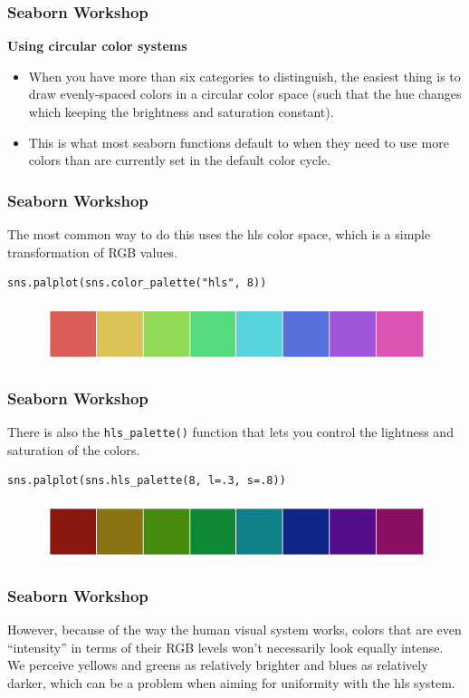 \documentclass{beamer}
\begin{document}
\begin{frame}[fragile]
\frametitle{Seaborn Workshop}
\large
\noindent \textbf{Using circular color systems}
\begin{itemize}
\item When you have more than six categories to distinguish, the easiest thing is to draw evenly-spaced colors in a circular color space (such that the hue changes which keeping the brightness and saturation constant). 
\item This is what most seaborn functions default to when they need to use more colors than are currently set in the default color cycle.
\end{itemize}

\end{frame}
\begin{frame}[fragile]
	\frametitle{Seaborn Workshop}
	\large
The most common way to do this uses the hls color space, which is a simple transformation of RGB values.

\begin{verbatim}
sns.palplot(sns.color_palette("hls", 8))
\end{verbatim}
\begin{figure}
\centering
\includegraphics[width=0.7\linewidth]{images/color_palettes_10_0}
\caption{}
\label{fig:color_palettes_10_0}
\end{figure}


\end{frame}
\begin{frame}[fragile]
	\frametitle{Seaborn Workshop}
	\large
There is also the \texttt{hls\_palette()} function that lets you control the lightness and saturation of the colors.
\begin{verbatim}
sns.palplot(sns.hls_palette(8, l=.3, s=.8))
\end{verbatim}
\begin{figure}
\centering
\includegraphics[width=0.7\linewidth]{images/color_palettes_12_0}
\caption{}
\label{fig:color_palettes_12_0}
\end{figure}

\end{frame}
\begin{frame}[fragile]
\frametitle{Seaborn Workshop}
\large
However, because of the way the human visual system works, colors that are even “intensity” in terms of their RGB levels won’t necessarily look equally intense. We perceive yellows and greens as relatively brighter and blues as relatively darker, which can be a problem when aiming for uniformity with the hls system.
\end{frame}
\end{document}
